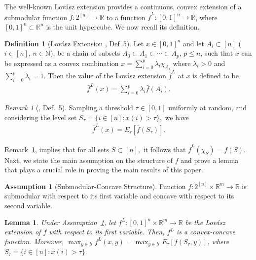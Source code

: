 \documentclass{article}
\theoremstyle{plain}
\newtheorem{lemma}[theorem]{Lemma}
\theoremstyle{definition}
\newtheorem{definition}[theorem]{Definition}
\newtheorem{assumption}[theorem]{Assumption}
\theoremstyle{remark}
\newtheorem{remark}[theorem]{Remark}
\newcommand{\R}{\mathbb{R}}
\newcommand{\N}{\mathbb{N}}
\begin{document}
The well-known Lovász extension provides a continuous, convex extension of a submodular function 
$\bar{f} : 2^{[n]} \to \mathbb{R}$ to a function $\bar{f}^L:
[0,1]^n \to \mathbb{R}$, where $ [0,1]^n\subset \R^n$ is the unit hypercube.
We now recall its definition.
\begin{definition}[Lovász Extension \cite{hazan2012online}, Def~5]\label{def:lovae}
    Let $x\in[0,1]^n$ and
    let $A_i\subset [n]$ ($i\in [n]$, $n\in \N$), be a chain of subsets
    $A_0\subset A_1 \subset \cdots \subset A_p$, $p\leq n$, 
    such that $x$ can be expressed as a convex combination $x=\sum_{i=0}^p \lambda_i\chi_{A_i}$ where $\lambda_i>0$ and $\sum_{i=0}^p\lambda_i=1.$ Then the value of the Lovász extension $\bar{f}^L$ at $x$ is defined to be
    \begin{align}\label{eq:eqle1}
        \bar{f}^L(x) = \sum_{i=0}^p \lambda_i\bar{f}(A_i).
    \end{align}
\end{definition}
\begin{remark}[\cite{hazan2012online}, Def.~5] \label{rem:lovae}
Sampling  
a threshold $\tau\in[0,1]$ uniformly at random, and considering the level set 
$S_\tau=\{i\in [n]:x(i)>\tau\},$  we have 
    \begin{align}\label{eq:eqle2}
        \bar{f}^L(x) = E_\tau[\bar{f}(S_\tau)].
    \end{align}
\end{remark}
Remark~\ref{rem:lovae}, 
implies that for all sets $S\subset[n],$ it follows that $\bar{f}^L(\chi_S)=\bar{f}(S).$
Next, we state the main assumption on the structure of $f$ and prove a lemma that plays a crucial role in proving the main results of this paper.
\begin{assumption}[Submodular-Concave Structure] \label{assum:main}
Function $f: 2^{[n]}\times\mathbb{R}^m\to\mathbb{R}$ is submodular with respect to its first variable and concave with respect to its second variable. 
\end{assumption}
\begin{lemma}\label{lm:xylova}
    Under Assumption~\ref{assum:main}, let 
    $f^L:[0,1]^n \times \mathbb{R}^m \rightarrow \mathbb{R}$ be the Lovász extension of $f$ with respect to its first variable. Then, $f^L$ is a convex-concave function. Moreover, $\max_{y\in\mathcal{Y}}f^L(x,y) = \max_{y\in\mathcal{Y}}E_\tau[f(S_\tau,y)]$, where $S_\tau=\{i\in [n]:x(i)>\tau\}.$
\end{lemma}
\end{document}
